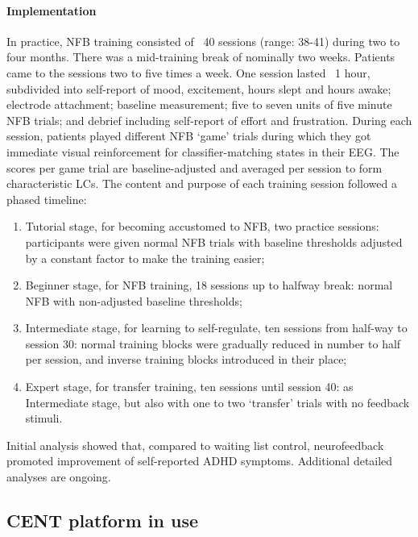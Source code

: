 \paragraph{Implementation}
In practice, NFB training consisted of ~40 sessions (range: 38-41) during two to four months. There was a mid-training break of nominally two weeks. Patients came to the sessions two to five times a week. One session lasted ~1 hour, subdivided into self-report of mood, excitement, hours slept and hours awake; electrode attachment; baseline measurement; five to seven units of five minute NFB trials; and debrief including self-report of effort and frustration. During each session, patients played different NFB ‘game’ trials during which they got immediate visual reinforcement for classifier-matching states in their EEG. The scores per game trial are baseline-adjusted and averaged per session to form characteristic LCs. The content and purpose of each training session followed a phased timeline:

\begin{enumerate}
	\item Tutorial stage, for becoming accustomed to NFB, two practice sessions: participants were given normal NFB trials with baseline thresholds adjusted by a constant factor to make the training easier; 
	
	\item Beginner stage, for NFB training, 18 sessions up to halfway break: normal NFB with non-adjusted baseline thresholds; 
	
	\item Intermediate stage, for learning to self-regulate, ten sessions from half-way to session 30: normal training blocks were gradually reduced in number to half per session, and inverse training blocks introduced in their place; 
	
	\item Expert stage, for transfer training, ten sessions until session 40: as Intermediate stage, but also with one to two ‘transfer’ trials with no feedback stimuli.
	
\end{enumerate}


Initial analysis showed that, compared to waiting list control, neurofeedback promoted improvement of self-reported ADHD symptoms. Additional detailed analyses are ongoing.


\subsection{CENT platform in use}

